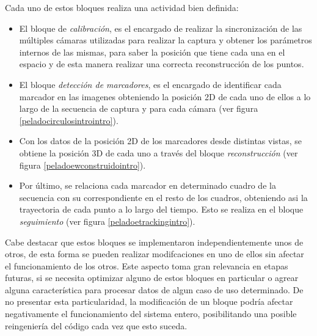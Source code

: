 Cada uno de estos bloques realiza una actividad bien definida:
\begin{itemize}
\item El bloque de \emph{calibración}, es el encargado de realizar la sincronización de las múltiples cámaras utilizadas para realizar la captura y obtener los parámetros internos de las mismas, para saber la posición que tiene cada una en el espacio y de esta manera realizar una correcta reconstrucción de los puntos.
\item El bloque \emph{detección de marcadores}, es el encargado de identificar cada marcador en las imagenes obteniendo la posición 2D de cada uno de ellos a lo largo de la secuencia de captura y para cada cámara (ver figura \ref{peladocirculosintrointro}).
\item Con los datos de la posición 2D de los marcadores desde distintas vistas, se obtiene la posición 3D de cada uno a través del bloque \emph{reconstrucción} (ver figura \ref{peladoewconstruidointro}).
\item Por último, se relaciona cada marcador en determinado cuadro de la secuencia con su correspondiente en el resto de los cuadros, obteniendo asi la trayectoria de cada punto a lo largo del tiempo. Esto se realiza en el bloque \emph{seguimiento} (ver figura \ref{peladoetrackingintro}).
\end{itemize}

Cabe destacar que estos bloques se implementaron independientemente unos de otros, de esta forma se pueden realizar modifcaciones en uno de ellos sin afectar el funcionamiento de los otros. Este aspecto toma gran relevancia en etapas futuras, si se necesita optimizar alguno de estos bloques en particular o agrear alguna característica para procesar datos de algun caso de uso determinado. De no presentar esta particularidad, la modificación de un bloque podría afectar negativamente el funcionamiento del sistema entero, posibilitando una posible reingeniería del código cada vez que esto suceda.

